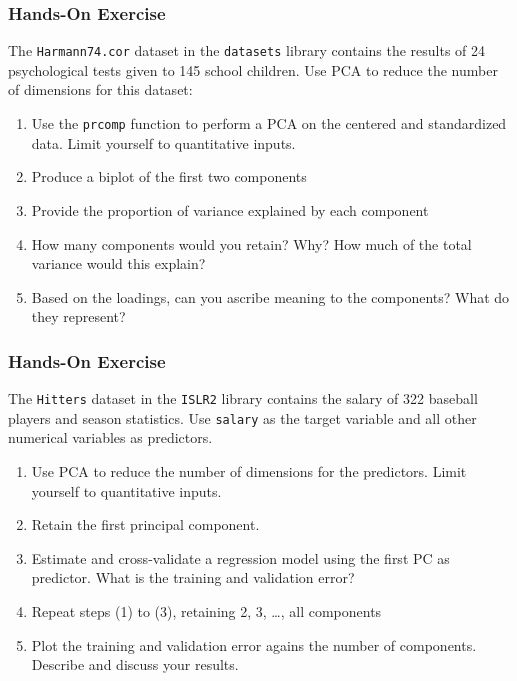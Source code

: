 \begin{tcolorbox}[colback=code]
\subsubsection*{Hands-On Exercise} 
The \texttt{Harmann74.cor} dataset in the \texttt{datasets} library contains the results of 24 psychological tests given to 145 school children. 
Use PCA to reduce the number of dimensions for this dataset:
\begin{enumerate}
   \item Use the \texttt{prcomp} function to perform a PCA on the centered and standardized data. Limit yourself to quantitative inputs.
   \item Produce a biplot of the first two components
   \item Provide the proportion of variance explained by each component
   \item How many components would you retain? Why? How much of the total variance would this explain?
   \item Based on the loadings, can you ascribe meaning to the components? What do they represent?
\end{enumerate}
\end{tcolorbox}

\begin{tcolorbox}[colback=code]
\subsubsection*{Hands-On Exercise} 
The \texttt{Hitters} dataset in the \texttt{ISLR2} library contains the salary of 322 baseball players and season statistics. Use \texttt{salary} as the target variable and all other numerical variables as predictors. 

\begin{enumerate}
   \item Use PCA to reduce the number of dimensions for the predictors. Limit yourself to quantitative inputs.
   \item Retain the first principal component.
   \item Estimate and cross-validate a regression model using the first PC as predictor. What is the training and validation error?
   \item Repeat steps (1) to (3), retaining 2, 3, \ldots, all components
   \item Plot the training and validation error agains the number of components. Describe and discuss your results.
\end{enumerate}
\end{tcolorbox}

